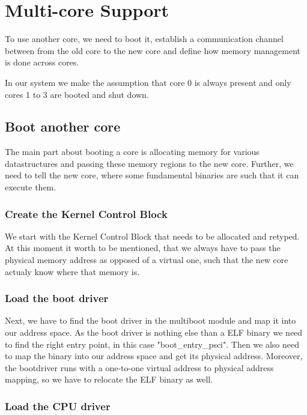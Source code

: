 \section{Multi-core Support}

To use another core, we need to boot it, establish a communication channel between from the old core to the new core and define how memory management is done across cores.

In our system we make the assumption that core 0 is always present and only cores 1 to 3 are booted and shut down.

\subsection{Boot another core}

The main part about booting a core is allocating memory for various datastructures and passing these memory regions to the new core. Further, we need to tell the new core, where some fundamental binaries are such that it can execute them.

\subsubsection{Create the Kernel Control Block}

We start with the Kernel Control Block that needs to be allocated and retyped. At this moment it worth to be mentioned, that we always have to pass the physical memory address as opposed of a virtual one, such that the new core actualy know where that memory is. 

\subsubsection{Load the boot driver}

Next, we have to find the boot driver in the multiboot module and map it into our address space. As the boot driver is nothing else than a ELF binary we need to find the right entry point, in this case "boot\_entry\_psci". Then we also need to map the binary into our address space and get its physical address. Moreover, the bootdriver runs with a one-to-one virtual address to physical address mapping, so we have to relocate the ELF binary as well.


\subsubsection{Load the CPU driver}

